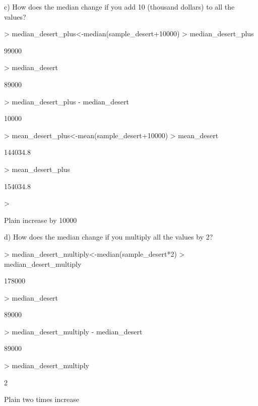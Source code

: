 \documentclass[12pt]{article}
\begin{document}
c) How does the median change if you add 10 (thousand dollars) to all the values?
\begin{Schunk}
\begin{Sinput}
> median_desert_plus<-median(sample_desert+10000)
> median_desert_plus
\end{Sinput}
\begin{Soutput}
[1] 99000
\end{Soutput}
\begin{Sinput}
> median_desert
\end{Sinput}
\begin{Soutput}
[1] 89000
\end{Soutput}
\begin{Sinput}
> median_desert_plus - median_desert
\end{Sinput}
\begin{Soutput}
[1] 10000
\end{Soutput}
\begin{Sinput}
> mean_desert_plus<-mean(sample_desert+10000)
> mean_desert
\end{Sinput}
\begin{Soutput}
[1] 144034.8
\end{Soutput}
\begin{Sinput}
> mean_desert_plus
\end{Sinput}
\begin{Soutput}
[1] 154034.8
\end{Soutput}
\begin{Sinput}
> 
\end{Sinput}
\end{Schunk}
Plain increase by 10000

d) How does the median change if you multiply all the values by 2?
\begin{Schunk}
\begin{Sinput}
> median_desert_multiply<-median(sample_desert*2)
> median_desert_multiply
\end{Sinput}
\begin{Soutput}
[1] 178000
\end{Soutput}
\begin{Sinput}
> median_desert
\end{Sinput}
\begin{Soutput}
[1] 89000
\end{Soutput}
\begin{Sinput}
> median_desert_multiply - median_desert
\end{Sinput}
\begin{Soutput}
[1] 89000
\end{Soutput}
\begin{Sinput}
> median_desert_multiply %/% median_desert
\end{Sinput}
\begin{Soutput}
[1] 2
\end{Soutput}
\end{Schunk}
Plain two times increase 
\end{document}
